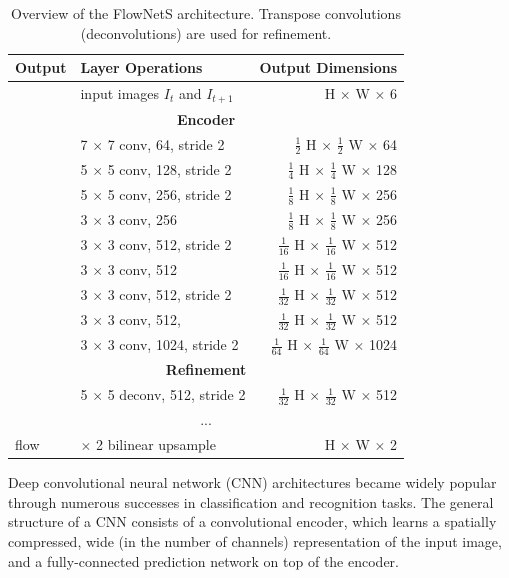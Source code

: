 {
\begin{table}[h]
\centering
\begin{tabular}{llr}
\toprule
\textbf{Output} & \textbf{Layer Operations} & \textbf{Output Dimensions} \\
\midrule\midrule
 & input images $I_t$ and $I_{t+1}$ & H $\times$ W $\times$ 6 \\
\midrule
\multicolumn{3}{c}{\textbf{Encoder}}\\
\midrule
& 7 $\times$ 7 conv, 64, stride 2 & $\tfrac{1}{2}$ H $\times$ $\tfrac{1}{2}$ W $\times$ 64 \\
& 5 $\times$ 5 conv, 128, stride 2 & $\tfrac{1}{4}$ H $\times$ $\tfrac{1}{4}$ W $\times$ 128 \\
& 5 $\times$ 5 conv, 256, stride 2 & $\tfrac{1}{8}$ H $\times$ $\tfrac{1}{8}$ W $\times$ 256 \\
& 3 $\times$ 3 conv, 256 & $\tfrac{1}{8}$ H $\times$ $\tfrac{1}{8}$ W $\times$ 256 \\
& 3 $\times$ 3 conv, 512, stride 2 & $\tfrac{1}{16}$ H $\times$ $\tfrac{1}{16}$ W $\times$ 512 \\
& 3 $\times$ 3 conv, 512 & $\tfrac{1}{16}$ H $\times$ $\tfrac{1}{16}$ W $\times$ 512 \\
& 3 $\times$ 3 conv, 512, stride 2 & $\tfrac{1}{32}$ H $\times$ $\tfrac{1}{32}$ W $\times$ 512 \\
& 3 $\times$ 3 conv, 512, & $\tfrac{1}{32}$ H $\times$ $\tfrac{1}{32}$ W $\times$ 512 \\
& 3 $\times$ 3 conv, 1024, stride 2 & $\tfrac{1}{64}$ H $\times$ $\tfrac{1}{64}$ W $\times$ 1024 \\
\midrule
\multicolumn{3}{c}{\textbf{Refinement}}\\
\midrule
& 5 $\times$ 5 deconv, 512, stride 2 & $\tfrac{1}{32}$ H $\times$ $\tfrac{1}{32}$ W $\times$ 512 \\
\multicolumn{3}{c}{...}\\
\midrule
flow & $\times$ 2 bilinear upsample & H $\times$ W $\times$ 2 \\
\bottomrule
\end{tabular}
\caption {
Overview of the FlowNetS \cite{FlowNet} architecture. Transpose convolutions (deconvolutions)
are used for refinement.
}
\label{table:flownets}
\end{table}
}

Deep convolutional neural network (CNN) architectures
\cite{ImageNetCNN, VGGNet, ResNet}
became widely popular through numerous successes in classification and recognition tasks.
The general structure of a CNN consists of a convolutional encoder, which
learns a spatially compressed, wide (in the number of channels) representation of the input image,
and a fully-connected prediction network on top of the encoder.

